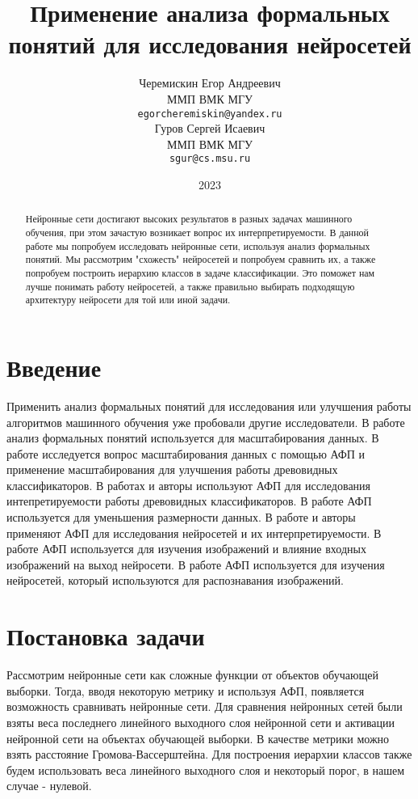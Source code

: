 \documentclass{article}
\title{Применение анализа формальных понятий для исследования нейросетей}
\author{ Черемискин Егор Андреевич \\
	ММП ВМК МГУ \\
	\texttt{egorcheremiskin@yandex.ru} \\
    \And
	Гуров Сергей Исаевич\\
	ММП ВМК МГУ\\
	\texttt{sgur@cs.msu.ru} \\
}
\date{2023}
\begin{document}
\maketitle

\begin{abstract}

Нейронные сети достигают высоких результатов в разных задачах машинного обучения, при этом зачастую возникает вопрос их интерпретируемости. В данной работе мы попробуем исследовать нейронные сети, используя анализ формальных понятий. Мы рассмотрим "схожесть" нейросетей и попробуем сравнить их, а также попробуем построить иерархию классов в задаче классификации. Это поможет нам лучше понимать работу нейросетей, а также правильно выбирать подходящую архитектуру нейросети для той или иной задачи.
 
\end{abstract}


\section{Введение}

Применить анализ формальных понятий для исследования или улучшения работы алгоритмов машинного обучения уже пробовали другие исследователи. В работе \citep{r1} анализ формальных понятий используется для масштабирования данных. В работе \citep{r2} исследуется вопрос масштабирования данных с помощью АФП и применение масштабирования для улучшения работы древовидных классификаторов. В работах \citep{r3} и \citep{r9} авторы используют АФП для исследования интепретируемости работы древовидных классификаторов. В работе \citep{r6} АФП используется для уменьшения размерности данных. В работе \citep{r4} и \citep{r5} авторы применяют АФП для исследования нейросетей и их интерпретируемости. В работе \citep{r7} АФП используется для изучения изображений и влияние входных изображений на выход нейросети. В работе \citep{r8} АФП используется для изучения нейросетей, который используются для распознавания изображений. 

\section{Постановка задачи}

Рассмотрим нейронные сети как сложные функции от объектов обучающей выборки. Тогда, вводя некоторую метрику и используя АФП, появляется возможность сравнивать нейронные сети. Для сравнения нейронных сетей были взяты веса последнего линейного выходного слоя нейронной сети и активации нейронной сети на объектах обучающей выборки. В качестве метрики можно взять расстояние Громова-Вассерштейна. Для построения иерархии классов также будем использовать веса линейного выходного слоя и некоторый порог, в нашем случае - нулевой. 
\end{document}
